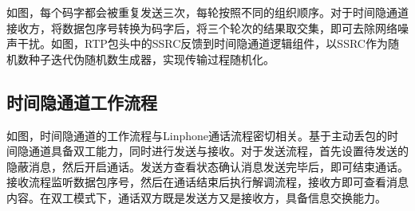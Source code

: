 
如图，每个码字都会被重复发送三次，每轮按照不同的组织顺序。对于时间隐通道接收方，将数据包序号转换为码字后，将三个轮次的结果取交集，即可去除网络噪声干扰。如图，RTP包头中的SSRC反馈到时间隐通道逻辑组件，以SSRC作为随机数种子迭代伪随机数生成器，实现传输过程随机化。

\subsection{时间隐通道工作流程}
\label{chap:linphone:designation:workflow}


如图，时间隐通道的工作流程与Linphone通话流程密切相关。基于主动丢包的时间隐通道具备双工能力，同时进行发送与接收。对于发送流程，首先设置待发送的隐蔽消息，然后开启通话。发送方查看状态确认消息发送完毕后，即可结束通话。接收流程监听数据包序号，然后在通话结束后执行解调流程，接收方即可查看消息内容。在双工模式下，通话双方既是发送方又是接收方，具备信息交换能力。